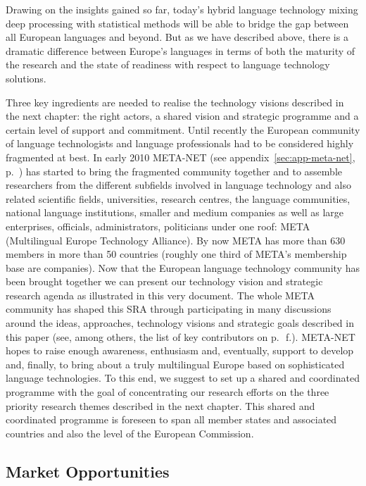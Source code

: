 \documentclass[10pt, plain]{../../metanetpaper}
\begin{document}
\begin{multicols}{2}
Drawing on the insights gained so far, today’s hybrid language technology mixing deep processing with statistical methods will be able to bridge the gap between all European languages and beyond. But as we have described above, there is a dramatic difference between Europe’s languages in terms of both the maturity of the research and the state of readiness with respect to language technology solutions. 

Three key ingredients are needed to realise the technology visions described in the next chapter: the right actors, a shared vision and strategic programme and a certain level of support and commitment. Until recently the European community of language technologists and language professionals had to be considered highly fragmented at best. In early 2010 META-NET (see appendix~\ref{sec:app-meta-net}, p.~\pageref{sec:app-meta-net}) has started to bring the fragmented community together and to assemble researchers from the different subfields involved in language technology and also related scientific fields, universities, research centres, the language communities, national language institutions, smaller and medium companies as well as large enterprises, officials, administrators, politicians under one roof: META (Multilingual Europe Technology Alliance). By now META has more than 630 members in more than 50 countries (roughly one third of META's membership base are companies). Now that the European language technology community has been brought together we can present our technology vision and strategic research agenda as illustrated in this very document. The whole META community has shaped this SRA through participating in many discussions around the ideas, approaches, technology visions and strategic goals described in this paper (see, among others, the list of key contributors on p.~\pageref{sec:list-of-contributors}\,f.). META-NET hopes to raise enough awareness, enthusiasm and, eventually, support to develop and, finally, to bring about a truly multilingual Europe based on sophisticated language technologies. To this end, we suggest to set up a shared and coordinated programme with the goal of concentrating our research efforts on the three priority research themes described in the next chapter. This shared and coordinated programme is foreseen to span all member states and associated countries and also the level of the European Commission.

\subsection{Market Opportunities}
\label{sec:lang-techn-industry}


\end{multicols}
\end{document}
